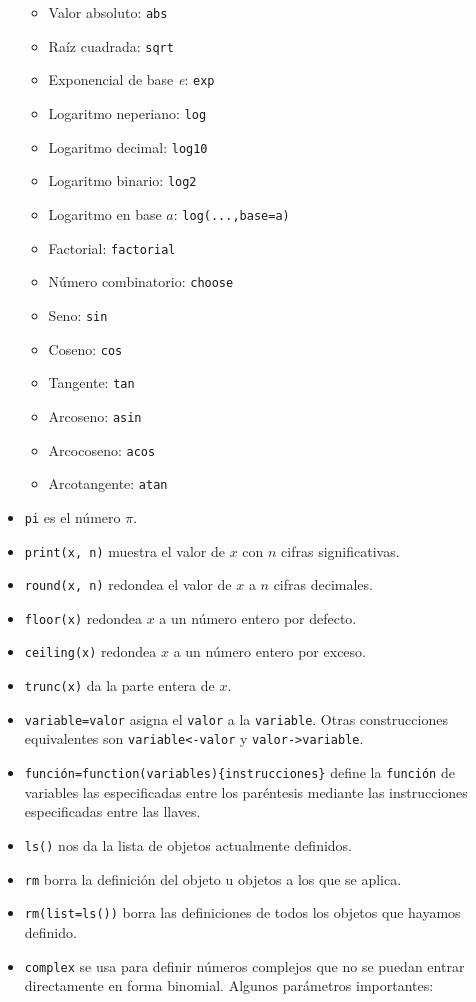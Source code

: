 \documentclass[
]{book}
\providecommand{\tightlist}{%
  \setlength{\itemsep}{0pt}\setlength{\parskip}{0pt}}
\theoremstyle{definition}
\theoremstyle{definition}
\theoremstyle{definition}
\theoremstyle{remark}
\begin{document}
\begin{itemize}
  \begin{itemize}
  \tightlist
  \item
    Valor absoluto: \texttt{abs}
  \item
    Raíz cuadrada: \texttt{sqrt}
  \item
    Exponencial de base \emph{e}: \texttt{exp}
  \item
    Logaritmo neperiano: \texttt{log}
  \item
    Logaritmo decimal: \texttt{log10}
  \item
    Logaritmo binario: \texttt{log2}
  \item
    Logaritmo en base \(a\): \texttt{log(...,base=a)}
  \item
    Factorial: \texttt{factorial}
  \item
    Número combinatorio: \texttt{choose}
  \item
    Seno: \texttt{sin}
  \item
    Coseno: \texttt{cos}
  \item
    Tangente: \texttt{tan}
  \item
    Arcoseno: \texttt{asin}
  \item
    Arcocoseno: \texttt{acos}
  \item
    Arcotangente: \texttt{atan}
  \end{itemize}
\item
  \texttt{pi} es el número \(\pi\).
\item
  \texttt{print(x,\ n)} muestra el valor de \(x\) con \(n\) cifras significativas.
\item
  \texttt{round(x,\ n)} redondea el valor de \(x\) a \(n\) cifras decimales.
\item
  \texttt{floor(x)} redondea \(x\) a un número entero por defecto.
\item
  \texttt{ceiling(x)} redondea \(x\) a un número entero por exceso.
\item
  \texttt{trunc(x)} da la parte entera de \(x\).
\item
  \texttt{variable=valor} asigna el \texttt{valor} a la \texttt{variable}. Otras construcciones equivalentes son \texttt{variable\textless{}-valor} y \texttt{valor-\textgreater{}variable}.
\item
  \texttt{función=function(variables)\{instrucciones\}} define la \texttt{función} de variables las especificadas entre los paréntesis mediante las instrucciones especificadas entre las llaves.
\item
  \texttt{ls()} nos da la lista de objetos actualmente definidos.
\item
  \texttt{rm} borra la definición del objeto u objetos a los que se aplica.
\item
  \texttt{rm(list=ls())} borra las definiciones de todos los objetos que hayamos definido.
\item
  \texttt{complex} se usa para definir números complejos que no se puedan entrar directamente en forma binomial. Algunos parámetros importantes:


\end{itemize}
\end{document}
